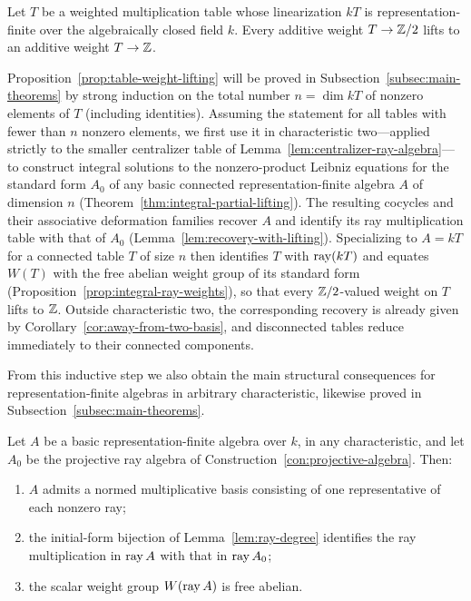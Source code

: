 \begin{proposition}
\label{prop:table-weight-lifting}
Let $T$ be a weighted multiplication table whose linearization $kT$ is representation-finite over the algebraically closed field $k$. Every additive weight $T\to\mathbb Z/2$ lifts to an additive weight $T\to\mathbb Z$.
\end{proposition}

Proposition~\ref{prop:table-weight-lifting} will be proved in Subsection~\ref{subsec:main-theorems} by strong induction on the total number $n=\dim kT$ of nonzero elements of $T$ (including identities). Assuming the statement for all tables with fewer than $n$ nonzero elements, we first use it in characteristic two—applied strictly to the smaller centralizer table of Lemma~\ref{lem:centralizer-ray-algebra}—to construct integral solutions to the nonzero-product Leibniz equations for the standard form $A_0$ of any basic connected representation-finite algebra $A$ of dimension $n$ (Theorem~\ref{thm:integral-partial-lifting}). The resulting cocycles and their associative deformation families recover $A$ and identify its ray multiplication table with that of $A_0$ (Lemma~\ref{lem:recovery-with-lifting}). Specializing to $A=kT$ for a connected table $T$ of size $n$ then identifies $T$ with $\operatorname{ray}(kT)$ and equates $W(T)$ with the free abelian weight group of its standard form (Proposition~\ref{prop:integral-ray-weights}), so that every $\mathbb Z/2$-valued weight on $T$ lifts to $\mathbb Z$. Outside characteristic two, the corresponding recovery is already given by Corollary~\ref{cor:away-from-two-basis}, and disconnected tables reduce immediately to their connected components.

From this inductive step we also obtain the main structural consequences for representation-finite algebras in arbitrary characteristic, likewise proved in Subsection~\ref{subsec:main-theorems}.

\begin{proposition}
\label{prop:dimension-induction}
Let $A$ be a basic representation-finite algebra over $k$, in any characteristic, and let $A_0$ be the projective ray algebra of Construction~\ref{con:projective-algebra}. Then:
\begin{enumerate}[label={\upshape(\arabic*)}]
\item $A$ admits a normed multiplicative basis consisting of one representative of each nonzero ray;
\item the initial-form bijection of Lemma~\ref{lem:ray-degree} identifies the ray multiplication in $\operatorname{ray} A$ with that in $\operatorname{ray} A_0$;
\item the scalar weight group $W(\operatorname{ray} A)$ is free abelian.
\end{enumerate}
\end{proposition}

